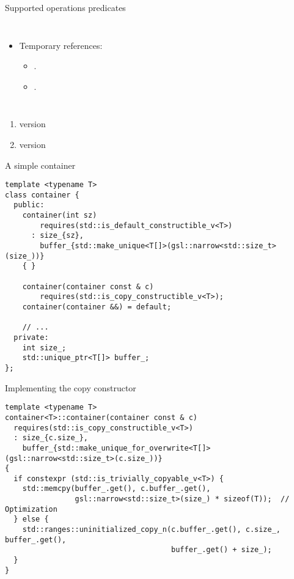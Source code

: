 \begin{frame}[t,fragile,shrink=10]{Supported operations predicates}
\begin{columns}[T]
\begin{itemize}
  \item Temporary references:
    \begin{itemize}
      \item {}.
      \item {}.
    \end{itemize}
\end{itemize}
\end{columns}

\begin{enumerate}
\item { version}
\item { version}
\end{enumerate}
\end{frame}

\begin{frame}[t,fragile]
\begin{block}{A simple container}
\begin{lstlisting}
template <typename T>
class container {
  public:
    container(int sz)
        requires(std::is_default_constructible_v<T>)
      : size_{sz}, 
        buffer_{std::make_unique<T[]>(gsl::narrow<std::size_t>(size_))} 
    { }  

    container(container const & c)
        requires(std::is_copy_constructible_v<T>);
    container(container &&) = default;

    // ...
  private:
    int size_;
    std::unique_ptr<T[]> buffer_;
};
\end{lstlisting}
\end{block}
\end{frame}

\begin{frame}[t,fragile]
\begin{block}{Implementing the copy constructor}
\begin{lstlisting}
template <typename T>
container<T>::container(container const & c)
  requires(std::is_copy_constructible_v<T>)
  : size_{c.size_},                                                                    
    buffer_{std::make_unique_for_overwrite<T[]>(gsl::narrow<std::size_t>(c.size_))} 
{  
  if constexpr (std::is_trivially_copyable_v<T>) {
    std::memcpy(buffer_.get(), c.buffer_.get(),
                gsl::narrow<std::size_t>(size_) * sizeof(T));  // Optimization
  } else {
    std::ranges::uninitialized_copy_n(c.buffer_.get(), c.size_, buffer_.get(),
                                      buffer_.get() + size_);
  }
}
\end{lstlisting}
\end{block}
\end{frame}
